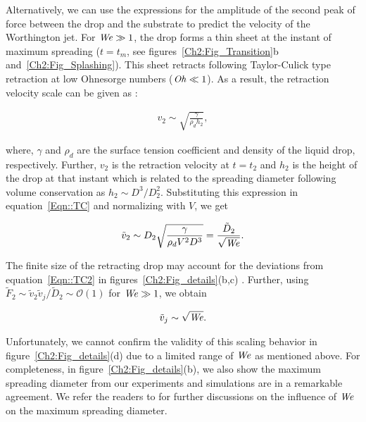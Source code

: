 \begin{subappendices}
	Alternatively, we can use the expressions for the amplitude of the second peak of force between the drop and the substrate to predict the velocity of the Worthington jet. For $\mathit{We} \gg 1$, the drop forms a thin sheet at the instant of maximum spreading ($t = t_m$, see figures~\ref{Ch2:Fig_Transition}b and~\ref{Ch2:Fig_Splashing}). This sheet retracts following Taylor-Culick type retraction at low Ohnesorge numbers ($\mathit{Oh} \ll 1$). As a result, the retraction velocity scale can be given as \cite{bartolo2005retraction, eggers2010drop}:
	
	\begin{align}
		v_2 \sim \sqrt{\frac{\gamma}{\rho_d h_2}},
		\label{Eqn::TC}
	\end{align}
	
	\noindent where, $\gamma$ and $\rho_d$ are the surface tension coefficient and density of the liquid drop, respectively. Further, $v_2$ is the retraction velocity at $t = t_2$ and $h_2$  is the height of the drop at that instant which is related to the spreading diameter following volume conservation as $h_2 \sim D^3/D_2^2$. Substituting this expression in equation~\eqref{Eqn::TC} and normalizing with $V$, we get
	
	\begin{align}
		\tilde{v}_2 \sim D_2\sqrt{\frac{\gamma}{\rho_dV^2 D^3}} = \frac{\tilde{D}_2}{\sqrt{\mathit{We}}}.
		\label{Eqn::TC2}
	\end{align}
	
	\noindent The finite size of the retracting drop may account for the deviations from equation~\eqref{Eqn::TC2} in figures~\ref{Ch2:Fig_details}(b,c) \cite{pierson2020revisiting, deka2020revisiting}. Further, using $\tilde{F}_2 \sim \tilde{v}_2\tilde{v}_j/\tilde{D}_2 \sim \mathcal{O}\left(1\right)$ for $\mathit{We} \gg 1$, we obtain
	
	\begin{align}
		\tilde{v}_j \sim \sqrt{\mathit{We}}.
		\label{Eqn::TCj}
	\end{align}
	
	\noindent Unfortunately, we cannot confirm the validity of this scaling behavior in figure~\ref{Ch2:Fig_details}(d) due to a limited range of $\mathit{We}$ as mentioned above. For completeness, in figure~\ref{Ch2:Fig_details}(b), we also show the maximum spreading diameter from our experiments and simulations are in a remarkable agreement. We refer the readers to \cite{clanet2004, eggers2010drop, laan2014maximum} for further discussions on the influence of $\mathit{We}$ on the maximum spreading diameter.
		

\end{subappendices}
